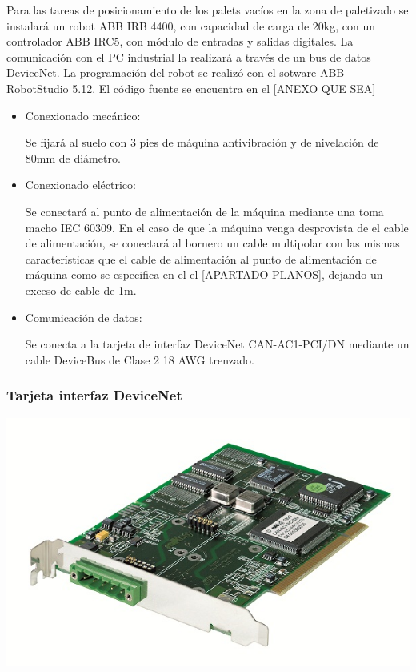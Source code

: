	Para las tareas de posicionamiento de los palets vacíos en la zona de paletizado se instalará un robot ABB IRB 4400, con capacidad de carga de 20kg, con un controlador ABB IRC5, con módulo de entradas y salidas digitales. La comunicación con el PC industrial la realizará a través de un bus de datos DeviceNet. La programación del robot se realizó con el sotware ABB RobotStudio 5.12. El código fuente se encuentra en el [ANEXO QUE SEA]\\
		\begin{itemize}
				\item{Conexionado mecánico:}
				
				Se fijará al suelo con 3 pies de máquina antivibración y de nivelación de 80mm de diámetro.

				\item{Conexionado eléctrico:}

				Se conectará al punto de alimentación de la máquina mediante una  toma macho IEC 60309. En el caso de que la máquina venga desprovista de el cable de alimentación, se conectará al bornero un cable multipolar con las mismas características que el cable de alimentación al punto de alimentación de máquina como se especifica en el el [APARTADO PLANOS], dejando un exceso de cable de 1m. \	
							
				\item{Comunicación de datos:}

				Se conecta a la tarjeta de interfaz DeviceNet CAN-AC1-PCI/DN mediante un cable DeviceBus de Clase 2 18 AWG trenzado.
		\end{itemize}
\newpage

	\subsubsection{Tarjeta interfaz DeviceNet}

	\includegraphics[width=1\textwidth]{Datasheets/10aFoto.jpg}

